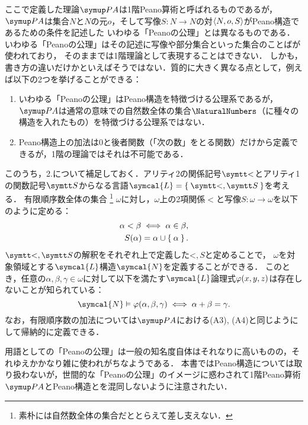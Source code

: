 \begin{Note}
	ここで定義した理論\(\PA\)は1階Peano算術と呼ばれるものであるが，
	\(\PA\)は集合\(N\)と\(N\)の元\(o\)，そして写像\(S \colon N \to N\)の対\(\langle N, o, S \rangle\)がPeano構造であるための条件を記述した
	いわゆる「Peanoの公理」とは異なるものである．
	いわゆる「Peanoの公理」はその記述に写像や部分集合といった集合のことばが使われており，
	そのままでは1階理論として表現することはできない．
	しかも，書き方の違いだけかといえばそうではない．質的に大きく異なる点として，例えば以下の2つを挙げることができる：
	\begin{enumerate}
		\item いわゆる「Peanoの公理」はPeano構造を特徴づける公理系であるが，
		      \(\PA\)は通常の意味での自然数全体の集合\(\NaturalNumbers\)（に種々の構造を入れたもの）を特徴づける公理系ではない．
		\item Peano構造上の加法は0と後者関数（「次の数」をとる関数）だけから定義できるが，1階の理論ではそれは不可能である．
	\end{enumerate}

	このうち，2.について補足しておく．アリティ2の関係記号\(\obj{<}\)とアリティ1の関数記号\(\obj{S}\)からなる言語\(\symcal{L} = \Set{\obj{<}, \obj{S}}\)を考える．
	有限順序数全体の集合%
	\footnote{%
		素朴には自然数全体の集合だととらえて差し支えない．%
	}%
	\(\omega\)に対し，\(\omega\)上の2項関係\(<\)と写像\(S \colon \omega \to \omega\)を以下のように定める：
	\begin{align*}
		\alpha < \beta \metaequivalent \alpha \in \beta, \\
		\apply{S}{\alpha} = \alpha \cup \Set{\alpha}.
	\end{align*}
	\(\obj{<}, \obj{S}\)の解釈をそれぞれ上で定義した\(\mathord{<}, S\)と定めることで，
	\(\omega\)を対象領域とする\(\symcal{L}\)構造\(\symcal{N}\)を定義することができる．
	このとき，任意の\(\alpha, \beta, \gamma \in \omega\)に対して以下を満たす\(\symcal{L}\)論理式\(\apply{\varphi}{x, y, z}\)は存在しないことが知られている：
	\[
		\symcal{N} \satisfy \apply{\varphi}{\alpha, \beta, \gamma} \metaequivalent \alpha + \beta = \gamma.
	\]
	なお，有限順序数の加法については\(\PA\)における(A3), (A4)と同じようにして帰納的に定義できる．

	用語としての「Peanoの公理」は一般の知名度自体はそれなりに高いものの，それゆえかかなり雑に使われがちなようである．
	本書ではPeano構造については取り扱わないが，世間的な「Peanoの公理」のイメージに惑わされて1階Peano算術\(\PA\)とPeano構造とを混同しないように注意されたい．
\end{Note}

